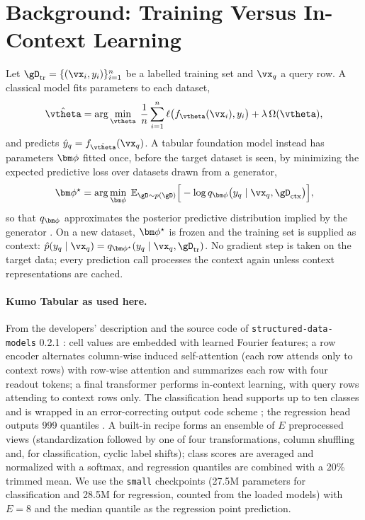 \section{Background: Training Versus In-Context Learning}
\label{sec:background}

Let $\gD_{\mathrm{tr}}=\{(\vx_i,y_i)\}_{i=1}^{n}$ be a labelled training set and $\vx_q$ a query row. A classical
model fits parameters to each dataset,
\begin{equation}
\hat{\vtheta}=\arg\min_{\vtheta}\;\frac{1}{n}\sum_{i=1}^{n}\ell\big(f_{\vtheta}(\vx_i),y_i\big)+\lambda\,\Omega(\vtheta),
\label{eq:erm}
\end{equation}
and predicts $\hat{y}_q=f_{\hat{\vtheta}}(\vx_q)$. A tabular foundation model instead has parameters $\vphi$ fitted
once, before the target dataset is seen, by minimizing the expected predictive loss over datasets drawn from a
generator,
\begin{equation}
\vphi^{\star}=\arg\min_{\vphi}\;\mathbb{E}_{\gD\sim p(\gD)}\Big[-\log q_{\vphi}\big(y_q\mid\vx_q,\gD_{\mathrm{ctx}}\big)\Big],
\label{eq:pfn}
\end{equation}
so that $q_{\vphi}$ approximates the posterior predictive distribution implied by the generator \citep{muller2022pfn}.
On a new dataset, $\vphi^{\star}$ is frozen and the training set is supplied as context:
$\hat{p}(y_q\mid\vx_q)=q_{\vphi^{\star}}(y_q\mid\vx_q,\gD_{\mathrm{tr}})$. No gradient step is taken on the target
data; every prediction call processes the context again unless context representations are cached.

\paragraph{Kumo Tabular as used here.}
From the developers' description \citep{nvidia_kumo_blog} and the source code of \texttt{structured-data-models}
0.2.1 \citep{nvidia_sdm}: cell values are embedded with learned Fourier features; a row encoder alternates column-wise
induced self-attention (each row attends only to context rows) with row-wise attention and summarizes each row with
four readout tokens; a final transformer performs in-context learning, with query rows attending to context rows only.
The classification head supports up to ten classes and is wrapped in an error-correcting output code scheme
\citep{dietterich1995ecoc}; the regression head outputs 999 quantiles \citep{koenker1978quantiles}. A built-in recipe
forms an ensemble of $E$ preprocessed views (standardization followed by one of four transformations, column shuffling
and, for classification, cyclic label shifts); class scores are averaged and normalized with a softmax, and regression
quantiles are combined with a 20\% trimmed mean. We use the \texttt{small} checkpoints (27.5M parameters for
classification and 28.5M for regression, counted from the loaded models) with $E=8$ and the median quantile as the
regression point prediction.
